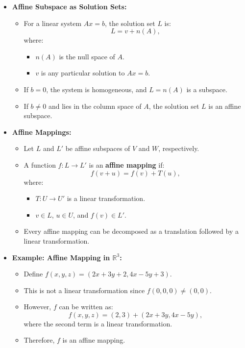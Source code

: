 \documentclass{article}
\begin{document}
\begin{itemize}
  \item \textbf{Affine Subspace as Solution Sets:}
    \begin{itemize}
      \item For a linear system $Ax = b$, the solution set $L$ is:
        \[
          L = v + n(A),
        \]
        where:
        \begin{itemize}
          \item $n(A)$ is the null space of $A$.
          \item $v$ is any particular solution to $Ax = b$.
        \end{itemize}
      \item If $b = 0$, the system is homogeneous, and $L = n(A)$ is a subspace.
      \item If $b \neq 0$ and lies in the column space of $A$, the solution set $L$ is an affine subspace.
    \end{itemize}

  \item \textbf{Affine Mappings:}
    \begin{itemize}
      \item Let $L$ and $L'$ be affine subspaces of $V$ and $W$, respectively.
      \item A function $f: L \to L'$ is an \textbf{affine mapping} if:
        \[
          f(v + u) = f(v) + T(u),
        \]
        where:
        \begin{itemize}
          \item $T: U \to U'$ is a linear transformation.
          \item $v \in L$, $u \in U$, and $f(v) \in L'$.
        \end{itemize}
      \item Every affine mapping can be decomposed as a translation followed by a linear transformation.
    \end{itemize}

  \item \textbf{Example: Affine Mapping in $\mathbb{R}^3$:}
    \begin{itemize}
      \item Define $f(x, y, z) = (2x + 3y + 2, 4x - 5y + 3)$.
      \item This is not a linear transformation since $f(0, 0, 0) \neq (0, 0)$.
      \item However, $f$ can be written as:
        \[
          f(x, y, z) = (2, 3) + (2x + 3y, 4x - 5y),
        \]
        where the second term is a linear transformation.
      \item Therefore, $f$ is an affine mapping.
    \end{itemize}
\end{itemize}
\end{document}
